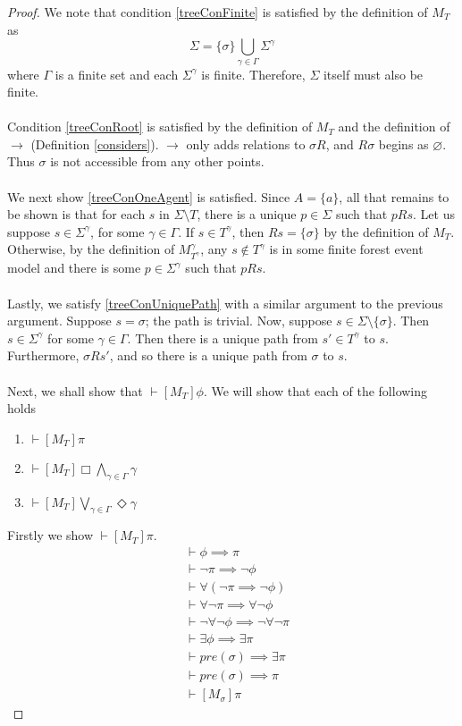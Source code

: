 \documentclass[12pt, a4paper, titlepage]{scrartcl}
\numberwithin{equation}{section}
\begin{document}
\begin{proof}
We note that condition \ref{treeConFinite} is satisfied by the definition of $M_T$ as
\[\Sigma = \{\sigma\} \bigcup_{\gamma \in \Gamma} \Sigma^{\gamma}\]
where $\Gamma$ is a finite set and each $\Sigma^\gamma$ is finite.
Therefore, $\Sigma$ itself must also be finite.\\
\\
Condition \ref{treeConRoot} is satisfied by the definition of $M_T$ and the definition of $\to$
(Definition \ref{considers}).
$\to$ only adds relations to $\sigma R$, and $R \sigma$ begins as $\varnothing$.
Thus $\sigma$ is not accessible from any other points.\\
\\
We next show \ref{treeConOneAgent} is satisfied.
Since $A = \{a\}$, all that remains to be shown is that for each $s$ in $\Sigma \setminus T$, there is a unique
$p \in \Sigma$ such that $p R s$.
Let us suppose $s \in \Sigma^\gamma$, for some $\gamma \in \Gamma$.
If $s \in T^\gamma$, then $R s = \{ \sigma \}$ by the definition of $M_T$.
Otherwise, by the definition of $M^\gamma_{T^\gamma}$, any $s \notin T^\gamma$ is in some finite
forest event model and there is some $p \in \Sigma^\gamma$ such that $p R s$.\\
\\
Lastly, we satisfy \ref{treeConUniquePath} with a similar argument to the previous argument.
Suppose $s = \sigma$; the path is trivial.
Now, suppose $s \in \Sigma \setminus \{ \sigma \}$.
Then $s \in \Sigma^\gamma$ for some $\gamma \in \Gamma$.
Then there is a unique path from $s' \in T^\gamma$ to $s$.
Furthermore, $\sigma R s'$, and so there is a unique path from $\sigma$ to $s$.\\
\\
Next, we shall show that $\vdash [M_T] \phi$.
We will show that each of the following holds
\begin{enumerate}
	\item $\vdash [ M_T ] \pi$
	\item $\vdash [ M_T ] \Box \bigwedge_{\gamma \in \Gamma} \gamma$
	\item $\vdash [ M_T ] \bigvee_{\gamma \in \Gamma} \Diamond \gamma$
\end{enumerate}

Firstly we show $\vdash [M_T] \pi$.
\begin{align}
	& \vdash \phi \implies \pi \\
	& \vdash \neg \pi \implies \neg \phi \\
	& \vdash \forall (\neg \pi \implies \neg \phi) \\
	& \vdash \forall \neg \pi \implies \forall \neg \phi \\
	& \vdash \neg \forall \neg \phi \implies \neg \forall \neg \pi \\
	& \vdash \exists \phi \implies \exists \pi \\
	& \vdash pre(\sigma) \implies \exists \pi \\
	& \vdash pre(\sigma) \implies \pi \\
	& \vdash [M_\sigma] \pi
\end{align}


\end{proof}
\end{document}
